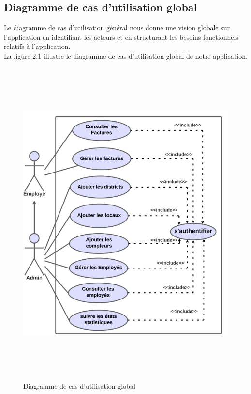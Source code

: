 \documentclass[12pt]{report}
\begin{document}
\subsection{Diagramme de cas d'utilisation global}
Le diagramme de cas d'utilisation général nous donne une vision globale sur l'application en identifiant les acteurs et en structurant les besoins fonctionnels relatifs à l'application.
\\
La figure 2.1 illustre le diagramme de cas d'utilisation global de notre application.

\begin{figure}[H]
  \centering
  \includegraphics[width=18cm,height=17cm]{newauth3}
  \caption{Diagramme de cas d'utilisation global}
  \label{fig:votre-label}
\end{figure}
\end{document}
